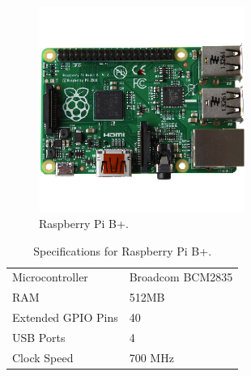 \begin{figure}[h!]
\centering
\includegraphics[width=0.6\textwidth]{chapters/analysis/figs/raspberry-pi-model-b-plus.png}
\caption{Raspberry Pi B+\cite{pibplus}.}
\label{fig:pibplus}
\end{figure}

\begin{table}[h!]
\centering
\begin{tabular}{| l | l |}
\hline
Microcontroller & Broadcom BCM2835\\
RAM & 512MB\\
Extended GPIO Pins & 40\\
USB Ports & 4\\
Clock Speed & 700 MHz\\
\hline
\end{tabular}
\caption{Specifications for Raspberry Pi B+\cite{pispecs}.}
\end{table}
\label{tab:pibplusspec}